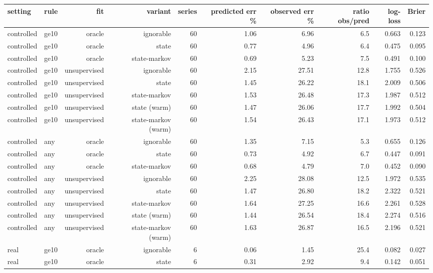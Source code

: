 \begin{table}[ht]
\centering
\small
\begin{tabular}{llrrrrrrrr}
\toprule
setting & rule & fit & variant & series & predicted err \% & observed err \% & ratio obs/pred & log-loss & Brier \\
\midrule
controlled & ge10 & oracle & ignorable & 60 & 1.06 & 6.96 & 6.5 & 0.663 & 0.123 \\
controlled & ge10 & oracle & state & 60 & 0.77 & 4.96 & 6.4 & 0.475 & 0.095 \\
controlled & ge10 & oracle & state-markov & 60 & 0.69 & 5.23 & 7.5 & 0.491 & 0.100 \\
controlled & ge10 & unsupervised & ignorable & 60 & 2.15 & 27.51 & 12.8 & 1.755 & 0.526 \\
controlled & ge10 & unsupervised & state & 60 & 1.45 & 26.22 & 18.1 & 2.009 & 0.506 \\
controlled & ge10 & unsupervised & state-markov & 60 & 1.53 & 26.48 & 17.3 & 1.987 & 0.512 \\
controlled & ge10 & unsupervised & state (warm) & 60 & 1.47 & 26.06 & 17.7 & 1.992 & 0.504 \\
controlled & ge10 & unsupervised & state-markov (warm) & 60 & 1.54 & 26.43 & 17.1 & 1.973 & 0.512 \\
controlled & any & oracle & ignorable & 60 & 1.35 & 7.15 & 5.3 & 0.655 & 0.126 \\
controlled & any & oracle & state & 60 & 0.73 & 4.92 & 6.7 & 0.447 & 0.091 \\
controlled & any & oracle & state-markov & 60 & 0.68 & 4.79 & 7.0 & 0.452 & 0.090 \\
controlled & any & unsupervised & ignorable & 60 & 2.25 & 28.08 & 12.5 & 1.972 & 0.535 \\
controlled & any & unsupervised & state & 60 & 1.47 & 26.80 & 18.2 & 2.322 & 0.521 \\
controlled & any & unsupervised & state-markov & 60 & 1.64 & 27.25 & 16.6 & 2.261 & 0.528 \\
controlled & any & unsupervised & state (warm) & 60 & 1.44 & 26.54 & 18.4 & 2.274 & 0.516 \\
controlled & any & unsupervised & state-markov (warm) & 60 & 1.63 & 26.87 & 16.5 & 2.196 & 0.521 \\
real & ge10 & oracle & ignorable & 6 & 0.06 & 1.45 & 25.4 & 0.082 & 0.027 \\
real & ge10 & oracle & state & 6 & 0.31 & 2.92 & 9.4 & 0.142 & 0.051 \\

\end{tabular}
\end{table}
